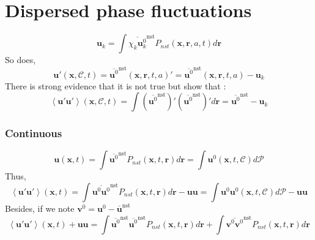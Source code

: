 \documentclass[12pt]{My_preprint}
\newcommand{\avg}[1]{\left<#1\right>}
\renewcommand{\avg}[1]{\left<#1\right>}
\newcommand{\nstavg}[1]{\overline{#1}^\text{nst}}
\newcommand{\CC}{\mathscr{C}}
\newcommand{\PP}{\mathscr{P}}
\begin{document}
\section{Dispersed phase fluctuations}
\begin{equation}
    \textbf{u}_k
    = \int \nstavg{\chi_k \textbf{u}_k^0} P_{nst}(\textbf{x},\textbf{r},a,t)d\textbf{r}
\end{equation}
So does, 
\begin{equation}
    \textbf{u}'(\textbf{x},\CC,t)
    =\nstavg{ \textbf{u}^0}(\textbf{x},\textbf{r},t,a)' 
    = \nstavg{ \textbf{u}^0}(\textbf{x},\textbf{r},t,a) - \textbf{u}_k
\end{equation}
There is strong evidence that it is not true but show that :
\begin{equation}
    \avg{\textbf{u}'\textbf{u}'}(\textbf{x},\CC,t)
    =\int{ (\nstavg{ \textbf{u}^0} )'(\nstavg{ \textbf{u}^0})' }d\textbf{r}
    = \nstavg{ \textbf{u}^0} - \textbf{u}_k
\end{equation}
\subsubsection*{Continuous}
\begin{equation*}
    \textbf{u}(\textbf{x},t)
    = \int \nstavg{ \textbf{u}^0}  P_{nst}(\textbf{x},t,\textbf{r}) d\textbf{r}
    = \int  \textbf{u}^0(\textbf{x},t,\CC) d\PP 
\end{equation*}
Thus, 
\begin{equation*}
    \avg{\textbf{u}'\textbf{u}'}(\textbf{x},t)
    = \int \nstavg{ \textbf{u}^0 \textbf{u}^0}  
    P_{nst}(\textbf{x},t,\textbf{r}) d\textbf{r}
    - \textbf{uu}
    = \int  \textbf{u}^0\textbf{u}^0(\textbf{x},t,\CC) d\PP 
    - \textbf{uu}
\end{equation*}
Besides, if we note $\textbf{v}^0  =  \textbf{u}^0  - \nstavg{\textbf{u}}$
\begin{equation*}
    \avg{\textbf{u}'\textbf{u}'}(\textbf{x},t)
    + \textbf{uu}
    = \int 
    \nstavg{\textbf{u}^0} \nstavg{\textbf{u}^0} 
    P_{nst}(\textbf{x},t,\textbf{r}) d\textbf{r}
    +\int 
    \nstavg{ \textbf{v}^0\textbf{v}^0}  
    P_{nst}(\textbf{x},t,\textbf{r}) d\textbf{r}
\end{equation*}
\end{document}
